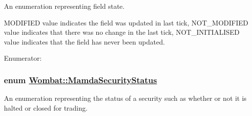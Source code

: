 An enumeration representing field state. 

MODIFIED value indicates the field was updated in last tick, NOT\_\-MODIFIED value indicates that there was no change in the last tick, NOT\_\-INITIALISED value indicates that the field has never been updated. \begin{Desc}
\item[Enumerator: ]\par
\begin{description}
\item[{\em 
\hypertarget{namespaceWombat_93aac974f2ab713554fd12a1fa3b7d2a2634ac8c664df2d1b704f7b0d21e969c}{
MODIFIED}
\label{namespaceWombat_93aac974f2ab713554fd12a1fa3b7d2a2634ac8c664df2d1b704f7b0d21e969c}
}]\item[{\em 
\hypertarget{namespaceWombat_93aac974f2ab713554fd12a1fa3b7d2a8775d4c624aaeb2c93a188bbd3f67abc}{
NOT\_\-MODIFIED}
\label{namespaceWombat_93aac974f2ab713554fd12a1fa3b7d2a8775d4c624aaeb2c93a188bbd3f67abc}
}]\item[{\em 
\hypertarget{namespaceWombat_93aac974f2ab713554fd12a1fa3b7d2a407ab2e280bdda05b51b8972a52a46a7}{
NOT\_\-INITIALISED}
\label{namespaceWombat_93aac974f2ab713554fd12a1fa3b7d2a407ab2e280bdda05b51b8972a52a46a7}
}]\end{description}
\end{Desc}

\hypertarget{namespaceWombat_073e683b7aeffa26cf3d2791dda32b4b}{
\subsubsection[MamdaSecurityStatus]{\setlength{\rightskip}{0pt plus 5cm}enum \hyperlink{namespaceWombat_073e683b7aeffa26cf3d2791dda32b4b}{Wombat::Mamda\-Security\-Status}}}
\label{namespaceWombat_073e683b7aeffa26cf3d2791dda32b4b}


An enumeration representing the status of a security such as whether or not it is halted or closed for trading. 

